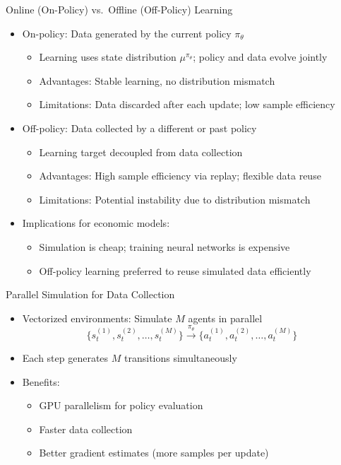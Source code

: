 \documentclass[aspectratio=169]{beamer}
\newcommand{\1}{\mathbf{1}}
\begin{document}
\begin{frame}{Online (On-Policy) vs.\ Offline (Off-Policy) Learning}
  \small
  \begin{itemize}
      \item On-policy: Data generated by the current policy $\pi_\theta$
      \begin{itemize}
          \item Learning uses state distribution $\mu^{\pi_\theta}$; policy and data evolve jointly
          \item Advantages: Stable learning, no distribution mismatch
          \item Limitations: Data discarded after each update; low sample efficiency
      \end{itemize}
      \item Off-policy: Data collected by a different or past policy
      \begin{itemize}
          \item Learning target decoupled from data collection
          \item Advantages: High sample efficiency via replay; flexible data reuse
          \item Limitations: Potential instability due to distribution mismatch
      \end{itemize}
      \item Implications for economic models:
      \begin{itemize}
          \item Simulation is cheap; training neural networks is expensive
          \item Off-policy learning preferred to reuse simulated data efficiently
      \end{itemize}
  \end{itemize}
\end{frame}

\begin{frame}{Parallel Simulation for Data Collection}
  \begin{itemize}
      \item Vectorized environments: Simulate $M$ agents in parallel
      \[
      \{s_t^{(1)}, s_t^{(2)}, \ldots, s_t^{(M)}\} \xrightarrow{\pi_\theta} \{a_t^{(1)}, a_t^{(2)}, \ldots, a_t^{(M)}\}
      \]
      \item Each step generates $M$ transitions simultaneously
      \item Benefits:
      \begin{itemize}
          \item GPU parallelism for policy evaluation
          \item Faster data collection
          \item Better gradient estimates (more samples per update)
      \end{itemize}
  \end{itemize}
\end{frame}
\end{document}
